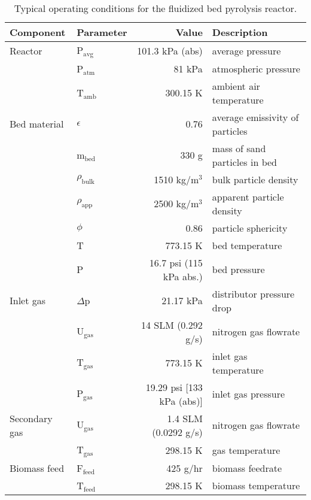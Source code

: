\begin{table}[H]
    \centering
    \caption{Typical operating conditions for the fluidized bed pyrolysis reactor.}
    \label{tab:operating}
    \begin{tabular}{llrl}
        \toprule
        Component & Parameter & Value & Description \\
        \midrule
        Reactor
            & P$_\textrm{avg}$ & 101.3 kPa (abs) & average pressure \\
            & P$_\textrm{atm}$ & 81 kPa & atmospheric pressure \\
            & T$_\textrm{amb}$ & 300.15 K & ambient air temperature \\
        Bed material
            & $\epsilon$ & 0.76 & average emissivity of particles \\
            & m$_\textrm{bed}$ & 330 g & mass of sand particles in bed \\
            & $\rho_\textrm{bulk}$ & 1510 kg/m$^3$ & bulk particle density \\
            & $\rho_\textrm{app}$ & 2500 kg/m$^3$ & apparent particle density \\
            & $\phi$ & 0.86 & particle sphericity \\
            & T & 773.15 K & bed temperature \\
            & P & 16.7 psi (115 kPa abs.) & bed pressure \\
        Inlet gas
            & $\Delta$p & 21.17 kPa & distributor pressure drop \\
            & U$_\textrm{gas}$ & 14 SLM (0.292 g/s) & nitrogen gas flowrate \\
            & T$_\textrm{gas}$ & 773.15 K & inlet gas temperature \\
            & P$_\textrm{gas}$ & 19.29 psi [133 kPa (abs)] & inlet gas pressure \\
        Secondary gas
            & U$_\textrm{gas}$ & 1.4 SLM (0.0292 g/s) & nitrogen gas flowrate \\
            & T$_\textrm{gas}$ & 298.15 K & gas temperature \\
        Biomass feed
            & F$_\textrm{feed}$ & 425 g/hr & biomass feedrate \\
            & T$_\textrm{feed}$ & 298.15 K & biomass temperature \\
        \bottomrule
    \end{tabular}
\end{table}

